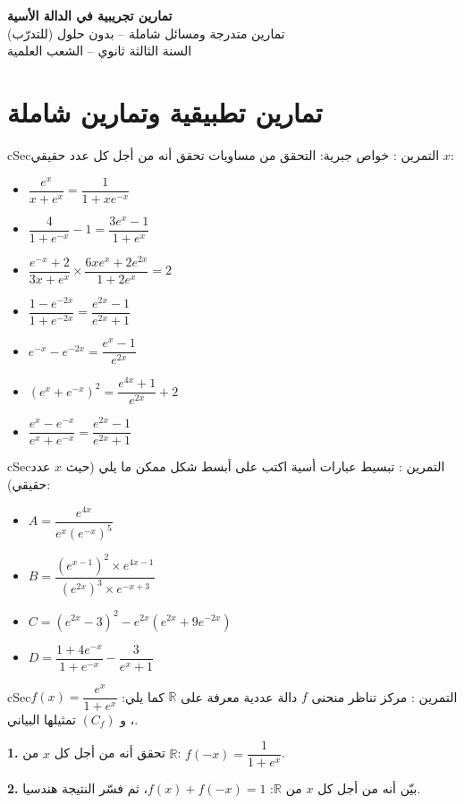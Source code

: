 \documentclass[12pt,a4paper]{article}
\newenvironment{BOX}[2]{\begin{otherlanguage}{english}\begin{arbox}{#1}{#2}}{\end{arbox}\end{otherlanguage}}
\newcounter{exo}
\newenvironment{tamrin}[1]{\stepcounter{exo}\begin{BOX}{cSec}{التمرين \theexo: #1}}{\end{BOX}}
\newenvironment{LTR}{\begin{otherlanguage}{english}}{\end{otherlanguage}}
\newcommand{\R}{\mathbb{R}}
\newenvironment{sq}{\begin{itemize}[leftmargin=2.4em,itemsep=3pt]}{\end{itemize}}
\newcommand{\qa}{\item[(أ)]}\newcommand{\qb}{\item[(ب)]}\newcommand{\qc}{\item[(جـ)]}\newcommand{\qd}{\item[(د)]}\newcommand{\qe}{\item[(هـ)]}
\newcommand{\QQ}[1]{\par\smallskip\textbf{#1.} }
\begin{document}
\begin{LTR}
\begin{tcolorbox}[enhanced,colback=cSec,colframe=cSec,arc=3mm,halign=center,boxrule=0pt,top=12pt,bottom=12pt,before upper={\selectlanguage{arabic}}]
{\color{white}\fontsize{24}{30}\selectfont\bfseries تمارين تجريبية في الدالة الأسية}\\[8pt]
{\color{white}\large تمارين متدرجة ومسائل شاملة -- بدون حلول (للتدرّب)}\\[5pt]
{\color{white}\large السنة الثالثة ثانوي -- الشعب العلمية}
\end{tcolorbox}
\end{LTR}
\section{تمارين تطبيقية وتمارين شاملة}
\begin{tamrin}{خواص جبرية: التحقق من مساويات}
تحقق أنه من أجل كل عدد حقيقي $x$:
\begin{sq}
\qa $\dfrac{e^{x}}{x+e^{x}}=\dfrac{1}{1+xe^{-x}}$
\qb $\dfrac{4}{1+e^{-x}}-1=\dfrac{3e^{x}-1}{1+e^{x}}$
\qc $\dfrac{e^{-x}+2}{3x+e^{x}}\times\dfrac{6xe^{x}+2e^{2x}}{1+2e^{x}}=2$
\qd $\dfrac{1-e^{-2x}}{1+e^{-2x}}=\dfrac{e^{2x}-1}{e^{2x}+1}$
\qe $e^{-x}-e^{-2x}=\dfrac{e^{x}-1}{e^{2x}}$
\item[(و)] $\left(e^{x}+e^{-x}\right)^{2}=\dfrac{e^{4x}+1}{e^{2x}}+2$
\item[(ز)] $\dfrac{e^{x}-e^{-x}}{e^{x}+e^{-x}}=\dfrac{e^{2x}-1}{e^{2x}+1}$
\end{sq}
\end{tamrin}

\begin{tamrin}{تبسيط عبارات أسية}
اكتب على أبسط شكل ممكن ما يلي (حيث $x$ عدد حقيقي):
\begin{sq}
\qa $A=\dfrac{e^{4x}}{e^{x}\left(e^{-x}\right)^{5}}$
\qb $B=\dfrac{\left(e^{x-1}\right)^{2}\times e^{4x-1}}{\left(e^{2x}\right)^{3}\times e^{-x+3}}$
\qc $C=\left(e^{2x}-3\right)^{2}-e^{2x}\left(e^{2x}+9e^{-2x}\right)$
\qd $D=\dfrac{1+4e^{-x}}{1+e^{-x}}-\dfrac{3}{e^{x}+1}$
\end{sq}
\end{tamrin}

\begin{tamrin}{مركز تناظر منحنى}
$f$ دالة عددية معرفة على $\R$ كما يلي: $f(x)=\dfrac{e^{x}}{1+e^{x}}$، و $(C_f)$ تمثيلها البياني.
\QQ{1} تحقق أنه من أجل كل $x$ من $\R$: $f(-x)=\dfrac{1}{1+e^{x}}$.
\QQ{2} بيّن أنه من أجل كل $x$ من $\R$: $f(x)+f(-x)=1$، ثم فسّر النتيجة هندسيا.
\end{tamrin}
\end{document}
